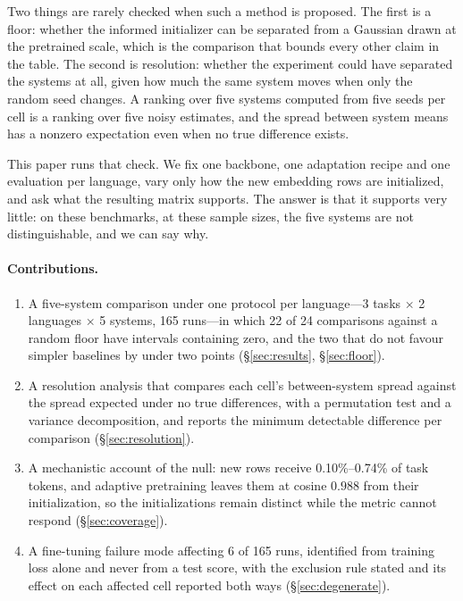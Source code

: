 \documentclass[11pt]{article}
\begin{document}
Two things are rarely checked when such a method is proposed. The first is a
floor: whether the informed initializer can be separated from a Gaussian
drawn at the pretrained scale, which is the comparison that bounds every
other claim in
the table. The second is resolution: whether the experiment could have
separated the systems at all, given how much the same system moves when only
the random seed changes. A ranking over five systems computed from five seeds
per cell is a ranking over five noisy estimates, and the spread between
system means has a nonzero expectation even when no true difference exists.

This paper runs that check. We fix one backbone, one adaptation recipe and
one evaluation per language, vary only how the new embedding rows are
initialized, and ask what the resulting matrix supports. The answer is that
it supports very little: on these benchmarks, at these sample sizes, the five
systems are not distinguishable, and we can say why.

\paragraph{Contributions.}
\begin{enumerate}
\itemsep0em
\item A five-system comparison under one protocol per language---3 tasks
  $\times$ 2 languages $\times$ 5 systems, 165 runs---in which 22 of 24
  comparisons against a random floor have intervals containing zero, and the
  two that do not favour simpler baselines by under two points
  (\S\ref{sec:results}, \S\ref{sec:floor}).
\item A resolution analysis that compares each cell's between-system spread
  against the spread expected under no true differences, with a permutation
  test and a variance decomposition, and reports the minimum detectable
  difference per comparison (\S\ref{sec:resolution}).
\item A mechanistic account of the null: new rows receive 0.10\%--0.74\% of
  task tokens, and adaptive pretraining leaves them at cosine $0.988$ from
  their initialization, so the initializations remain distinct while the
  metric cannot respond (\S\ref{sec:coverage}).
\item A fine-tuning failure mode affecting 6 of 165 runs, identified from
  training loss alone and never from a test score, with the exclusion rule
  stated and its effect on each affected cell reported both ways
  (\S\ref{sec:degenerate}).
\end{enumerate}
\end{document}
